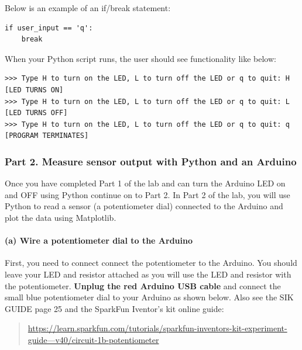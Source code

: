\documentclass[11pt]{article}
\begin{document}
Below is an example of an if/break statement:

\begin{verbatim}
if user_input == 'q':
    break 
\end{verbatim}

When your Python script runs, the user should see functionality like
below:

\begin{verbatim}
>>> Type H to turn on the LED, L to turn off the LED or q to quit: H
[LED TURNS ON]
>>> Type H to turn on the LED, L to turn off the LED or q to quit: L
[LED TURNS OFF]
>>> Type H to turn on the LED, L to turn off the LED or q to quit: q
[PROGRAM TERMINATES]
\end{verbatim}

    \hypertarget{part-2.-measure-sensor-output-with-python-and-an-arduino}{%
\subsubsection{Part 2. Measure sensor output with Python and an
Arduino}\label{part-2.-measure-sensor-output-with-python-and-an-arduino}}

Once you have completed Part 1 of the lab and can turn the Arduino LED
on and OFF using Python continue on to Part 2. In Part 2 of the lab, you
will use Python to read a sensor (a potentiometer dial) connected to the
Arduino and plot the data using Matplotlib.

    \hypertarget{a-wire-a-potentiometer-dial-to-the-arduino}{%
\paragraph{(a) Wire a potentiometer dial to the
Arduino}\label{a-wire-a-potentiometer-dial-to-the-arduino}}

First, you need to connect connect the potentiometer to the Arduino. You
should leave your LED and resistor attached as you will use the LED and
resistor with the potentiometer. \textbf{Unplug the red Arduino USB
cable} and connect the small blue potentiometer dial to your Arduino as
shown below. Also see the SIK GUIDE page 25 and the SparkFun Iventor's
kit online guide:

\begin{quote}
\href{https://learn.sparkfun.com/tutorials/sparkfun-inventors-kit-experiment-guide---v40/circuit-1b-potentiometer}{https://learn.sparkfun.com/tutorials/sparkfun-inventors-kit-experiment-guide---v40/circuit-1b-potentiometer}
\end{quote}
\end{document}
